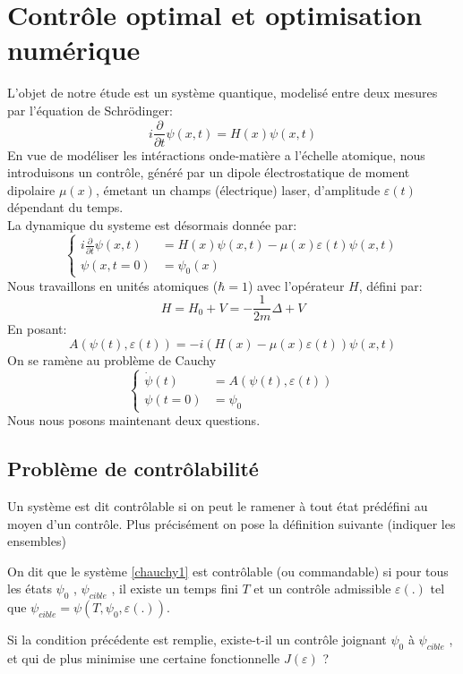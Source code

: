 \section*{Contrôle optimal et optimisation numérique}
L'objet de notre étude est un système quantique, modelisé entre deux mesures par l'équation de Schrödinger:
\begin{equation} \label{schrodinger}
i \frac{\partial }{\partial t} \psi (x,t) = H(x)\psi (x,t)
\end{equation}
En vue de modéliser les intéractions onde-matière a l'échelle atomique, nous introduisons un contrôle, généré par un dipole électrostatique de moment dipolaire $\mu (x)$, émetant un champs (électrique) laser, d'amplitude $\varepsilon (t)$ dépendant du temps.\\
La dynamique du systeme est désormais donnée par:
\begin{equation} \label{eq1}
\begin{cases}
i \frac{\partial }{\partial t} \psi (x,t) &= H(x)\psi (x,t)-\mu(x)\varepsilon(t)\psi (x,t) \\
\psi (x,t=0) &= \psi_0(x)
\end{cases}
\end{equation}
Nous travaillons en unités atomiques ($\hbar=1$) avec l’opérateur $H$, défini par:
$$
H = H_0 + V = -\frac{1}{2m} \varDelta + V
$$
En posant:
\begin{equation}
A(\psi(t),\varepsilon(t))= -i(H(x)-\mu(x)\varepsilon(t))\psi (x,t)
\end{equation}
On se ramène au problème de Cauchy
\begin{equation} \label{chauchy1}
\begin{cases}
\dot{\psi}(t) &= A(\psi(t),\varepsilon(t)) \\
\psi (t=0) &= \psi_0
\end{cases}
\end{equation}
Nous nous posons maintenant deux questions.
\subsection*{Problème de contrôlabilité}
Un système est dit contrôlable si on peut le ramener à tout état prédéfini au moyen d’un contrôle. Plus précisément on pose la définition suivante (indiquer les ensembles)
\begin{dfn}
On dit que le système \eqref{chauchy1} est contrôlable (ou commandable) si pour tous les états $\psi_0$ , $\psi_{cible}$ , il existe un temps fini $T$ et un contrôle admissible $\varepsilon(.)$ tel que $\psi_{cible} = \psi(T, \psi_0, \varepsilon(.))$.
\end{dfn}
Si la condition précédente est remplie, existe-t-il un contrôle joignant $\psi_0$ à $\psi_{cible}$ , et qui de plus
minimise une certaine fonctionnelle $J(\varepsilon)$ ?
